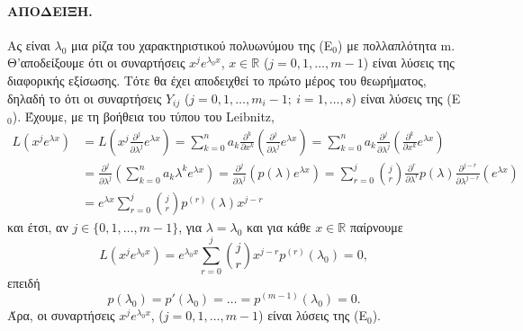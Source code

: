 \documentclass[11pt,a4paper,twoside]{book}
\begin{document}
\paragraph{ΑΠΟΔΕΙΞΗ.} Ας είναι $\lambda_0$ μια ρίζα του χαρακτηριστικού πολυωνύμου της (Ε$_0$) με πολλαπλότητα m. Θ'αποδείξουμε ότι οι συναρτήσεις $x^j e^{\lambda_0 x}$, $x\in\mathbb{R}$ ($j=0,1,\dots,m-1$) είναι λύσεις της διαφορικής εξίσωσης. Τότε θα έχει αποδειχθεί το πρώτο μέρος του θεωρήματος, δηλαδή το ότι οι συναρτήσεις $Y_{ij}$ ($j=0,1,\dots,m_i-1; \ i=1,\dots,s$) είναι λύσεις της (Ε$_0$). Έχουμε, με τη βοήθεια του τύπου του Leibnitz,
\begin{align*}
    L(x^j e^{\lambda x}) &= L\left(x^j \frac{\partial^j}{\partial \lambda^j} e^{\lambda x}\right) = \sum_{k=0}^n a_k \frac{\partial^k}{\partial x^k}\left(\frac{\partial^j}{\partial \lambda^j} e^{\lambda x}\right) = \sum_{k=0}^n a_k \frac{\partial^j}{\partial \lambda^j}\left(\frac{\partial^k}{\partial x^k} e^{\lambda x}\right) \\
    &= \frac{\partial^j}{\partial \lambda^j} \left(\sum_{k=0}^n a_k \lambda^k e^{\lambda x}\right) = \frac{\partial^j}{\partial \lambda^j} (p(\lambda)e^{\lambda x}) = \sum_{r=0}^j \binom{j}{r} \frac{\partial^r}{\partial \lambda^r} p(\lambda) \frac{\partial^{j-r}}{\partial \lambda^{j-r}} (e^{\lambda x}) \\
    &= e^{\lambda x} \sum_{r=0}^j \binom{j}{r} p^{(r)}(\lambda) x^{j-r}
\end{align*}
και έτσι, αν $j\in\{0,1,\dots,m-1\}$, για $\lambda=\lambda_0$ και για κάθε $x\in\mathbb{R}$ παίρνουμε
\[
    L(x^j e^{\lambda_0 x}) = e^{\lambda_0 x} \sum_{r=0}^j \binom{j}{r} x^{j-r} p^{(r)}(\lambda_0)=0,
\]
επειδή
\[
    p(\lambda_0)=p'(\lambda_0)=\dots=p^{(m-1)}(\lambda_0)=0.
\]
Άρα, οι συναρτήσεις $x^j e^{\lambda_0 x}$, ($j=0,1,\dots,m-1$) είναι λύσεις της (Ε$_0$).
\end{document}
